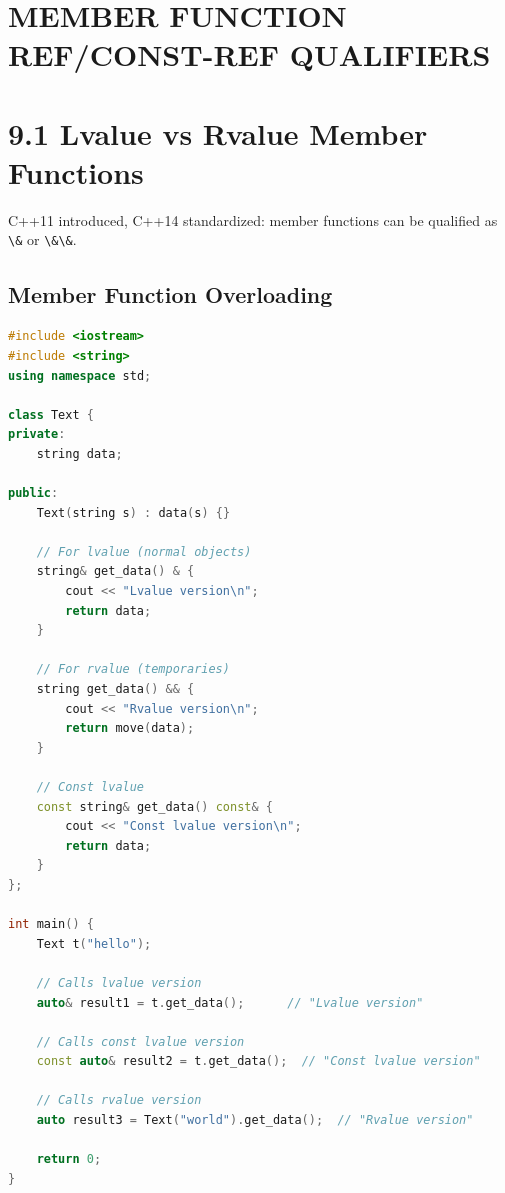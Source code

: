 \hypertarget{member-function-refconst-ref-qualifiers}{%
\section{MEMBER FUNCTION REF/CONST-REF
QUALIFIERS}\label{member-function-refconst-ref-qualifiers}}

\hypertarget{lvalue-vs-rvalue-member-functions}{%
\section{9.1 Lvalue vs Rvalue Member
Functions}\label{lvalue-vs-rvalue-member-functions}}

C++11 introduced, C++14 standardized: member functions can be qualified
as \passthrough{\lstinline!\&!} or \passthrough{\lstinline!\&\&!}.

\hypertarget{member-function-overloading}{%
\subsection{Member Function
Overloading}\label{member-function-overloading}}

\begin{lstlisting}[language={C++}]
#include <iostream>
#include <string>
using namespace std;

class Text {
private:
    string data;

public:
    Text(string s) : data(s) {}

    // For lvalue (normal objects)
    string& get_data() & {
        cout << "Lvalue version\n";
        return data;
    }

    // For rvalue (temporaries)
    string get_data() && {
        cout << "Rvalue version\n";
        return move(data);
    }

    // Const lvalue
    const string& get_data() const& {
        cout << "Const lvalue version\n";
        return data;
    }
};

int main() {
    Text t("hello");
    
    // Calls lvalue version
    auto& result1 = t.get_data();      // "Lvalue version"
    
    // Calls const lvalue version
    const auto& result2 = t.get_data();  // "Const lvalue version"
    
    // Calls rvalue version
    auto result3 = Text("world").get_data();  // "Rvalue version"
    
    return 0;
}
\end{lstlisting}

